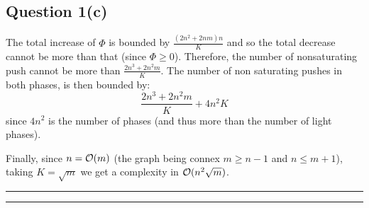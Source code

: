 \documentclass[math]{cours}
\begin{document}
\subsection{Question 1(c)}
The total increase of $\Phi$ is bounded by $\frac{(2n^{2} + 2nm)n}{K}$ and so the total decrease cannot be more than that (since $\Phi \geq 0$).
Therefore, the number of nonsaturating push cannot be more than $\frac{2n^{3} + 2n^{2}m}{K}$.
The number of non saturating pushes in both phases, is then bounded by:
\begin{equation*}
	\frac{2n^{3} + 2n^{2}m}{K} + 4n^{2}K
\end{equation*}
since $4n^{2}$ is the number of phases (and thus more than the number of light phases).

Finally, since $n = \mathcal{O}(m)$ (the graph being connex $m \geq n - 1$ and $n \leq m + 1$), taking $K = \sqrt{m}$ we get a complexity in $\mathcal{O}(n^{2}\sqrt{m})$.

\medskip
\hrule
\hrule
\medskip
\end{document}
